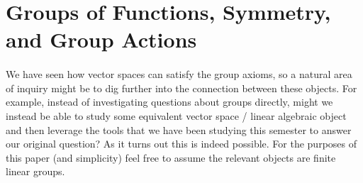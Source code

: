 \documentclass[twoside]{article}
\begin{document}
\section{Groups of Functions, Symmetry, and Group Actions}
\paragraph*{} We have seen how vector spaces can satisfy the group axioms, so a natural 
area of inquiry might be to dig further into the connection between these objects. 
For example, instead of investigating questions about groups directly, might we instead 
be able to study some equivalent vector space / linear algebraic object and then leverage 
the tools that we have been studying this semester to answer our original question? As 
it turns out this is indeed possible. For the purposes of this paper (and simplicity) 
feel free to assume the relevant objects are finite linear groups. 
\end{document}
